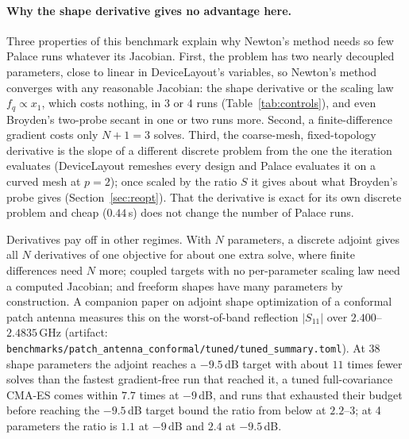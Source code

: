 \documentclass{anvil-paper}
\begin{document}
\paragraph{Why the shape derivative gives no advantage here.}
Three properties of this benchmark explain why Newton's method needs so
few Palace runs whatever its Jacobian. First, the problem has
two nearly decoupled parameters, close to linear in DeviceLayout's
variables, so Newton's method converges with any reasonable Jacobian: the
shape derivative or the scaling law $f_q \propto x_1$, which costs nothing,
in 3 or 4 runs (Table~\ref{tab:controls}), and even Broyden's two-probe
secant in one or two runs more. Second, a finite-difference gradient costs only $N+1 =
3$ solves. Third, the coarse-mesh, fixed-topology derivative is the slope
of a different discrete problem from the one the iteration evaluates
(DeviceLayout remeshes every design and Palace evaluates it on a curved
mesh at $p = 2$); once scaled by the ratio $S$ it gives about what
Broyden's probe gives (Section~\ref{sec:reopt}). That the derivative is exact for its own
discrete problem and cheap ($0.44$\,s) does not change the number of
Palace runs.

Derivatives pay off in other regimes. With $N$ parameters, a discrete
adjoint gives all $N$ derivatives of one objective for about one extra
solve, where finite differences need $N$ more; coupled targets with no
per-parameter scaling law need a computed Jacobian; and freeform shapes
have many parameters by construction. A companion paper on adjoint shape
optimization of a conformal patch antenna \citep{walters2026conformal}
measures this on the worst-of-band reflection $|S_{11}|$ over
$2.400$--$2.4835$\,GHz (artifact:
\texttt{benchmarks/patch\_antenna\_conformal/tuned/tuned\_summary.toml}).
At 38 shape parameters the adjoint reaches a $-9.5$\,dB target with about
$11$ times fewer solves than the fastest gradient-free run that reached it,
a tuned full-covariance CMA-ES comes within $7.7$ times at $-9$\,dB, and
runs that exhausted their budget before reaching the $-9.5$\,dB target
bound the ratio from below at $2.2$--$3$; at 4 parameters the ratio is $1.1$ at
$-9$\,dB and $2.4$ at $-9.5$\,dB.
\end{document}
